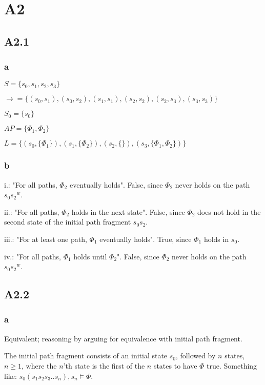 
\section{A2}

\subsection{A2.1}

\subsubsection{a}

$S = \{s_0, s_1, s_2, s_3\}$

$\rightarrow = \{
  (s_0, s_1), (s_0, s_2),
  (s_1, s_1),
  (s_2, s_2), (s_2, s_3),
  (s_3, s_3)
\}$

$S_0 = \{s_0\}$

$AP = \{\Phi_1, \Phi_2\}$

$L = \{
  (s_0, \{\Phi_1\}),
  (s_1, \{\Phi_2\}),
  (s_2, \{\}),
  (s_3, \{\Phi_1, \Phi_2\})
\}$

\subsubsection{b}

i.: "For all paths, $\Phi_2$ eventually holds". False, since $\Phi_2$ never holds on the path $s_0{s_2}^w$.

ii.: "For all paths, $\Phi_2$ holds in the next state". False, since $\Phi_2$ does not hold
     in the second state of the initial path fragment $s_0s_2$.

iii.: "For at least one path, $\Phi_1$ eventually holds". True, since $\Phi_1$ holds in $s_0$.

iv.: "For all paths, $\Phi_1$ holds until $\Phi_2$". False, since $\Phi_2$ never holds on the path $s_0{s_2}^w$.

\subsection{A2.2}

\subsubsection{a}

Equivalent; reasoning by arguing for equivalence with initial path fragment.

The initial path fragment consists of an initial state $s_0$,
followed by $n$ states, $n \ge 1$, where the $n$'th state
is the first of the $n$ states to have $\Phi$ true.
Something like: $s_0 ( s_1 s_2 s_3 .. s_n ), s_n \models \Phi$.

